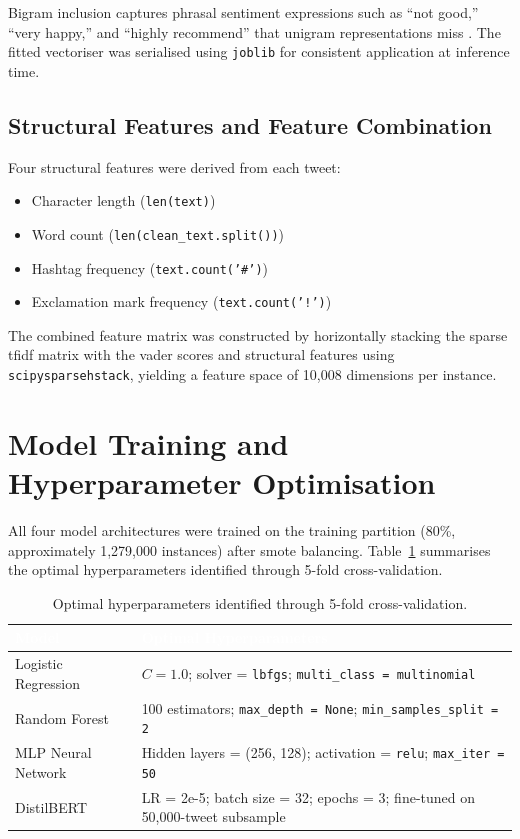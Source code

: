 Bigram inclusion captures phrasal sentiment expressions such as ``not good,'' ``very happy,'' and ``highly recommend'' that unigram representations miss \citep{pang2008opinion}. The fitted vectoriser was serialised using \texttt{joblib} for consistent application at inference time.

\subsection{Structural Features and Feature Combination}

Four structural features were derived from each tweet:
\begin{itemize}
  \item Character length (\texttt{len(text)})
  \item Word count (\texttt{len(clean\_text.split())})
  \item Hashtag frequency (\texttt{text.count('\#')})
  \item Exclamation mark frequency (\texttt{text.count('!')})
\end{itemize}

The combined feature matrix was constructed by horizontally stacking the sparse \gls{tfidf} matrix with the \gls{vader} scores and structural features using \texttt{scipysparsehstack}, yielding a feature space of 10,008 dimensions per instance.

\section{Model Training and Hyperparameter Optimisation}

All four model architectures were trained on the training partition (80\%, approximately 1,279,000 instances) after \gls{smote} balancing. Table~\ref{tab:hyperparams} summarises the optimal hyperparameters identified through 5-fold cross-validation.

\begin{table}[H]
\centering
\caption{Optimal hyperparameters identified through 5-fold cross-validation.}
\label{tab:hyperparams}
\begin{tabularx}{\linewidth}{lX}
  \toprule
  \rowcolor{uwsblue!90}
  \textcolor{white}{\textbf{Model}} & \textcolor{white}{\textbf{Optimal Hyperparameters}} \\
  \midrule
  \rowcolor{tablegrey}
  Logistic Regression & $C = 1.0$; solver = \texttt{lbfgs}; \texttt{multi\_class = multinomial} \\
  Random Forest       & 100 estimators; \texttt{max\_depth = None}; \texttt{min\_samples\_split = 2} \\
  \rowcolor{tablegrey}
  MLP Neural Network  & Hidden layers = (256, 128); activation = \texttt{relu}; \texttt{max\_iter = 50} \\
  DistilBERT          & LR = 2e-5; batch size = 32; epochs = 3; fine-tuned on 50,000-tweet subsample \\
  \bottomrule
\end{tabularx}
\end{table}

